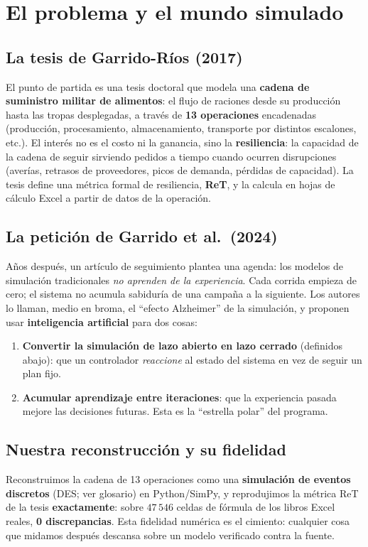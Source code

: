 \documentclass[11pt,a4paper]{article}
\begin{document}
\section{El problema y el mundo simulado}\label{sec:mundo}

\subsection{La tesis de Garrido-Ríos (2017)}
El punto de partida es una tesis doctoral que modela una \textbf{cadena de suministro militar de
alimentos}: el flujo de raciones desde su producción hasta las tropas desplegadas, a través de
\textbf{13 operaciones} encadenadas (producción, procesamiento, almacenamiento, transporte por
distintos escalones, etc.). El interés no es el costo ni la ganancia, sino la \textbf{resiliencia}: la
capacidad de la cadena de seguir sirviendo pedidos a tiempo cuando ocurren disrupciones (averías,
retrasos de proveedores, picos de demanda, pérdidas de capacidad). La tesis define una métrica formal
de resiliencia, \textbf{ReT}, y la calcula en hojas de cálculo Excel a partir de datos de la operación.

\subsection{La petición de Garrido et al.\ (2024)}
Años después, un artículo de seguimiento plantea una agenda: los modelos de simulación tradicionales
\emph{no aprenden de la experiencia}. Cada corrida empieza de cero; el sistema no acumula sabiduría de
una campaña a la siguiente. Los autores lo llaman, medio en broma, el ``efecto Alzheimer'' de la
simulación, y proponen usar \textbf{inteligencia artificial} para dos cosas:
\begin{enumerate}[nosep]
  \item \textbf{Convertir la simulación de lazo abierto en lazo cerrado} (definidos abajo): que un
        controlador \emph{reaccione} al estado del sistema en vez de seguir un plan fijo.
  \item \textbf{Acumular aprendizaje entre iteraciones}: que la experiencia pasada mejore las
        decisiones futuras. Esta es la ``estrella polar'' del programa.
\end{enumerate}

\subsection{Nuestra reconstrucción y su fidelidad}
Reconstruimos la cadena de 13 operaciones como una \textbf{simulación de eventos discretos} (DES; ver
glosario) en Python/SimPy, y reprodujimos la métrica ReT de la tesis \textbf{exactamente}: sobre
$47\,546$ celdas de fórmula de los libros Excel reales, \textbf{0 discrepancias}. Esta fidelidad
numérica es el cimiento: cualquier cosa que midamos después descansa sobre un modelo verificado contra
la fuente.
\end{document}
